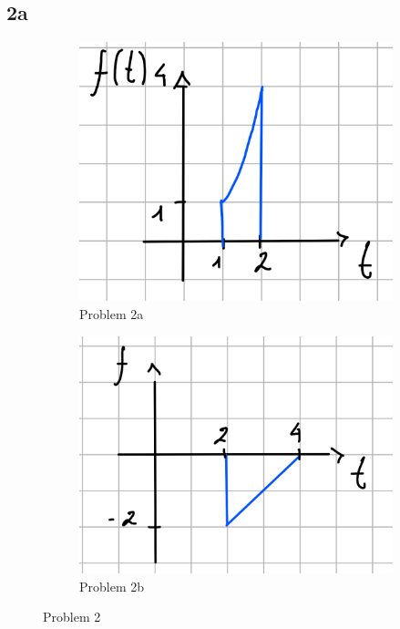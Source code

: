 \documentclass{article}
\begin{document}
\subsection*{2a}
\begin{figure}[H]
    \begin{subfigure}{0.5\textwidth}
        \includegraphics[width=\linewidth]{Ex_2a.jpg}
        \caption{Problem 2a}
    \end{subfigure}
    \begin{subfigure}{0.5\textwidth}
        \includegraphics[width=\linewidth]{Ex_2b.jpg}
        \caption{Problem 2b}
    \end{subfigure}
    \caption{Problem 2}
\end{figure}
\end{document}
